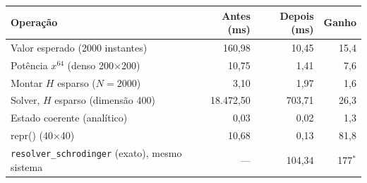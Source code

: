 \begin{tabular}{lrrr}
\toprule
Operação & Antes (ms) & Depois (ms) & Ganho \\
\midrule
Valor esperado (2000 instantes) & 160,98 & 10,45 & 15,4\\
Potência $x^{64}$ (denso 200×200) & 10,75 & 1,41 & 7,6\\
Montar $H$ esparso ($N = 2000$) & 3,10 & 1,97 & 1,6\\
Solver, $H$ esparso (dimensão 400) & 18.472,50 & 703,71 & 26,3\\
Estado coerente (analítico) & 0,03 & 0,02 & 1,3\\
repr() (40×40) & 10,68 & 0,13 & 81,8\\
\texttt{resolver\_schrodinger} (exato), mesmo sistema & --- & 104,34 & 177$^*$\\
\bottomrule
\end{tabular}
